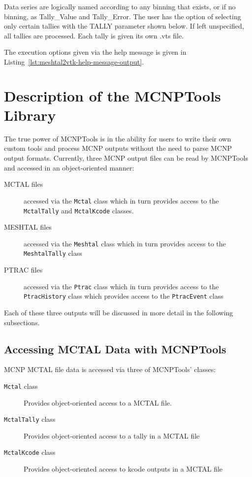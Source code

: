 \documentclass[11pt]{article}
\begin{document}
Data series are logically named according to any binning that exists, or if no
binning, as Tally\_Value and Tally\_Error. The user has the option of selecting
only certain tallies with the TALLY parameter shown below. If left unspecified,
all tallies are processed. Each tally is given its own .vts file.

The execution options given via the help message is given in
Listing~\ref{lst:meshtal2vtk-help-message-output}.

\section{Description of the MCNPTools
Library}\label{description-of-the-mcnptools-library}

The true power of MCNPTools is in the ability for users to write their own
custom tools and process MCNP outputs without the need to parse MCNP output
formats. Currently, three MCNP output files can be read by MCNPTools and
accessed in an object-oriented manner:

\begin{description}
  \item[MCTAL files] accessed via the \texttt{Mctal} class which in turn
    provides access to the \texttt{MctalTally} and \texttt{MctalKcode} classes.
  \item[MESHTAL files] accessed via the \texttt{Meshtal} class which in turn
    provides access to the \texttt{MeshtalTally} class
  \item[PTRAC files] accessed via the \texttt{Ptrac} class which in turn
    provides access to the \texttt{PtracHistory} class which provides access to
    the \texttt{PtracEvent} class
\end{description}

Each of these three outputs will be discussed in more detail in the
following subsections.

\subsection{Accessing MCTAL Data with
MCNPTools}\label{accessing-mctal-data-with-mcnptools}

MCNP MCTAL file data is accessed via three of MCNPTools' classes:

\begin{description}
  \item[\texttt{Mctal} class] Provides object-oriented access to a MCTAL file.
  \item[\texttt{MctalTally} class] Provides object-oriented access to a tally in
    a MCTAL file
  \item[\texttt{MctalKcode} class] Provides object-oriented access to kcode
    outputs in a MCTAL file
\end{description}
\end{document}
